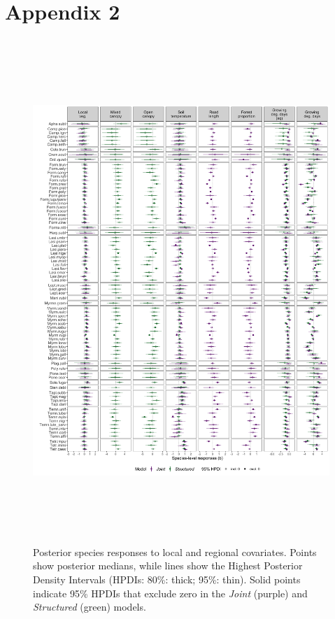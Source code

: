 \documentclass[preprint,review,times,12pt,3p]{elsarticle}
\begin{document}
\newpage

\section{Appendix 2}

\begin{figure}
	\centering\includegraphics[height=7.5in]{../../../ms/1_Ecography/1/figs/b_opt_byParam.png}
	\caption{\label{fig:b_byParam} Posterior species responses to local and regional covariates. Points show posterior medians, while lines show the Highest Posterior Density Intervals (HPDIs: 80\%: thick; 95\%: thin). Solid points indicate 95\% HPDIs that exclude zero in the \emph{Joint} (purple) and \emph{Structured} (green) models.}
\end{figure}
\end{document}
